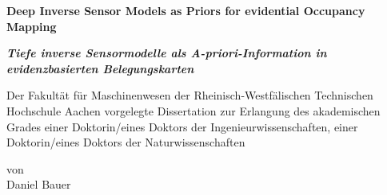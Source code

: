 
\begin{titlepage}
  \centering
  \begin{minipage}[t]{9.8cm}
      \begin{center}
          {\large \textbf{Deep Inverse Sensor Models as Priors for evidential Occupancy Mapping}}
          \bigskip
      \end{center}
  \end{minipage}
  \begin{minipage}[t]{9.8cm}
      \begin{center}
          {\large \textcolor{ikagrey}{\textit{\textbf{Tiefe inverse Sensormodelle als A-priori-Information in evidenzbasierten Belegungskarten}}}}
          \bigskip
      \end{center}
  \end{minipage}
  \vfill
  \begin{minipage}[t]{16.5cm}
      \begin{center}
          Der Fakultät für Maschinenwesen der Rheinisch-Westfälischen Technischen Hochschule
          Aachen vorgelegte Dissertation zur Erlangung des akademischen Grades einer Doktorin/eines
          Doktors der Ingenieurwissenschaften, einer Doktorin/eines Doktors der Naturwissenschaften
      \end{center}
  \end{minipage}
  \vfill
  \begin{minipage}[t]{9.8cm}
      \begin{center}
      	von\\
      	\vspace{\baselineskip}
          Daniel Bauer
      \end{center}
  \end{minipage}
\vfill
\end{titlepage}
\restoregeometry
